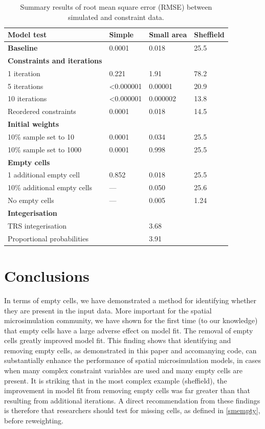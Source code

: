 \documentclass[a4paper,10pt]{article}
\begin{document}
\begin{table}[h]
\caption{Summary results of root mean square error (RMSE) between
simulated and constraint data.} \label{tsum}
\begin{center}
\begin{tabular}{llll}
\toprule
Model test & Simple & Small area  & Sheffield \\
\midrule
\textbf{Baseline} & 0.0001 & 0.018  & 25.5 \\
\midrule
\textbf{Constraints and iterations} &  &  & \\
1 iteration & 0.221 & 1.91 & 78.2 \\
5 iterations & \textless 0.000001 & 0.00001  & 20.9 \\
10 iterations & \textless 0.000001 & 0.000002  & 13.8 \\
Reordered constraints 		& 0.0001  & 0.018 & 14.5 \\ %
\midrule
\textbf{Initial weights} 	&  &  & \\
10\% sample set to 10  		& 0.0001 & 0.034  & 25.5\\
10\% sample set to 1000 	& 0.0001 & 0.998 & 25.5 \\
\midrule
\textbf{Empty cells} 		&  &  & \\
1 additional empty cell 	& 0.852 & 0.018  & 25.5 \\
10\% additional empty cells 	& --- & 0.050  & 25.6 \\
No empty cells			& --- & 0.005 & 1.24 \\
\midrule
\textbf{Integerisation} 	&  &  & \\
TRS integerisation				&  & 3.68  & \\
Proportional probabilities &  & 3.91 & \\
\bottomrule
\end{tabular}
\end{center}
\end{table}

\section{Conclusions}

In terms of empty cells, we have demonstrated a method for identifying
whether they are present in the input data. More important for the spatial microsimulation
community, we have shown for the first time (to our knowledge) that empty cells have a
large adverse effect on model fit. The removal of empty cells greatly improved model fit.
This finding shows that identifying and removing empty cells, as
demonstrated in this paper and accomanying code, can substantially enhance the performance of
spatial microsimulation models, in cases when many complex
constraint variables are used and many empty cells are present.
It is striking that in the most complex example (sheffield), the improvement in
model fit from removing empty cells was far greater than that resulting from
additional iterations.
A direct recommendation from these findings is therefore that researchers should
test for missing cells, as defined in \cref{smempty}, before reweighting. 
\end{document}
